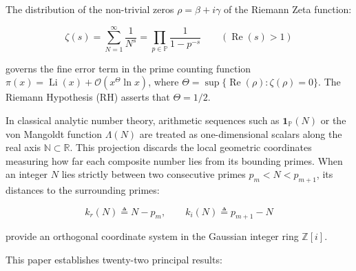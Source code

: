 \documentclass[
  11pt,
]{article}
\begin{document}
The distribution of the non-trivial zeros \(\rho = \beta + i\gamma\) of
the Riemann Zeta function:

\[\zeta(s) = \sum_{N=1}^\infty \frac{1}{N^s} = \prod_{p \in \mathbb{P}} \frac{1}{1 - p^{-s}} \qquad (\operatorname{Re}(s) > 1)\]

governs the fine error term in the prime counting function
\(\pi(x) = \operatorname{Li}(x) + \mathcal{O}(x^\Theta \ln x)\), where
\(\Theta = \sup \{\operatorname{Re}(\rho) : \zeta(\rho) = 0\}\). The
Riemann Hypothesis (RH) asserts that \(\Theta = 1/2\).

In classical analytic number theory, arithmetic sequences such as
\(\mathbf{1}_{\mathbb{P}}(N)\) or the von Mangoldt function
\(\Lambda(N)\) are treated as one-dimensional scalars along the real
axis \(\mathbb{N} \subset \mathbb{R}\). This projection discards the
local geometric coordinates measuring how far each composite number lies
from its bounding primes. When an integer \(N\) lies strictly between
two consecutive primes \(p_m < N < p_{m+1}\), its distances to the
surrounding primes:

\[k_r(N) \triangleq N - p_m, \qquad k_i(N) \triangleq p_{m+1} - N\]

provide an orthogonal coordinate system in the Gaussian integer ring
\(\mathbb{Z}[i]\).

This paper establishes twenty-two principal results:
\end{document}
